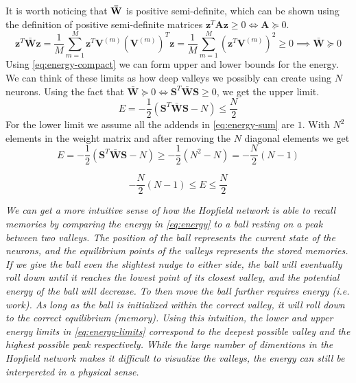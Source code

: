 It is worth noticing that $\bf \bar{W}$ is positive semi-definite, which can be shown using the definition of positive semi-definite matrices $\mathbf{z}^T \mathbf{A} \mathbf{z} \geq 0 \iff \mathbf{A} \succeq 0$.
\begin{equation*}
\mathbf{z}^T\bar{\mathbf{W}} \mathbf{z} = \frac{1}{M}\sum_{m=1}^M \mathbf{z}^T \mathbf{V}^{(m)}(\mathbf{V}^{(m)})^T \mathbf{z} = \frac{1}{M}\sum_{m=1}^M (\mathbf{z}^T \mathbf{V}^{(m)})^2 \geq 0 \implies \mathbf{\bar{W}} \succeq 0
\end{equation*}
Using \cref{eq:energy-compact} we can form upper and lower bounds for the energy. We can think of these limits as how deep valleys we possibly can create using $N$ neurons. Using the fact that $\mathbf{\bar{W}} \succeq 0 \iff \mathbf{S}^T \mathbf{\bar{W}}\mathbf{S} \geq 0$, we get the upper limit.
\begin{equation*}
    E = -\frac{1}{2}(\mathbf{S}^T \bar{\mathbf{W}} \mathbf{S} - N) \leq \frac{N}{2}
\end{equation*}
For the lower limit we assume all the addends in \cref{eq:energy-sum} are $1$. With $N^2$ elements in the weight matrix and after removing the $N$ diagonal elements we get
\begin{equation*}
    E = -\frac{1}{2}(\mathbf{S}^T \bar{\mathbf{W}} \mathbf{S} - N) \geq -\frac{1}{2} (N^2 - N) = -\frac{N}{2} (N-1) 
\end{equation*}

\begin{tcolorbox}[title={Energy Limits}]
    \begin{equation}\label{eq:energy-limits}
        -\frac{N}{2}(N-1) \leq E \leq \frac{N}{2}
    \end{equation}
\end{tcolorbox}

\begin{tcolorbox}[title={Intution behind the energy}]
    \textit{We can get a more intuitive sense of how the Hopfield network is able to recall memories by comparing the energy in \cref{eq:energy} to a ball resting on a peak between two valleys. The position of the ball represents the current state of the neurons, and the equilibrium points of the valleys represents the stored memories. If we give the ball even the slightest nudge to either side, the ball will eventually roll down until it reaches the lowest point of its closest valley, and the potential energy of the ball will decrease. To then move the ball further requires energy (i.e. work). As long as the ball is initialized within the correct valley, it will roll down to the correct equilibrium (memory). Using this intuition, the lower and upper energy limits in \cref{eq:energy-limits} correspond to the deepest possible valley and the highest possible peak respectively. While the large number of dimentions in the Hopfield network makes it difficult to visualize the valleys, the energy can still be interpereted in a physical sense.}
\end{tcolorbox}




